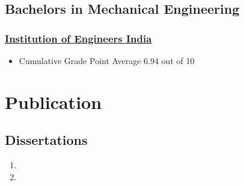 \documentclass{my_cv}%
\begin{document}
\subsection{Bachelors in Mechanical Engineering}
\subsubsection{\faInstitution \hspace{0.2em} \href{https://www.ieindia.org/webui/iei-home.aspx}{Institution of Engineers India}}
\begin{itemize}[leftmargin=0.15in]
\setlength\itemsep{-0.1em}
\color{mygray}
\item Cumulative Grade Point Average 6.94 out of 10
\end{itemize}
\section{Publication}
\vspace{1em}
%

 
\subsection{\faBook \hspace{0.2em} \bfseries Dissertations}
\vspace{1em}
\renewcommand{\theenumi}{D\arabic{enumi}}
\begin{enumerate}
\setlength\itemsep{-0.1em}
\color{mygray}
 \item {} 
 \item {} 
\end{enumerate}
\end{document}
